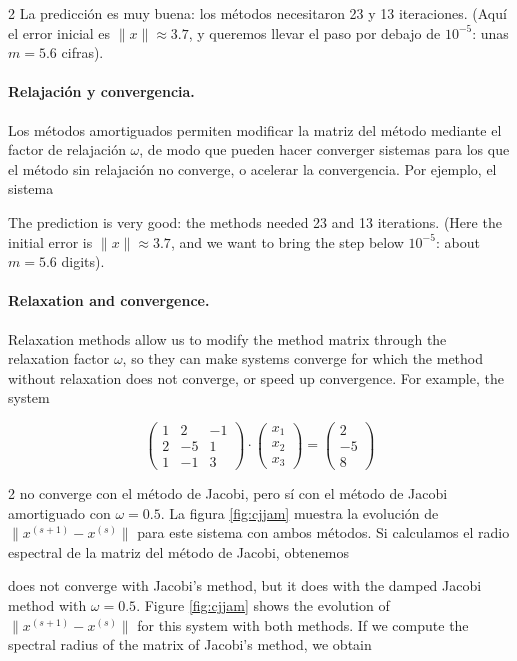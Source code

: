 \begin{paracol}{2}
La predicción es muy buena: los métodos necesitaron 23 y 13 iteraciones. (Aquí el error inicial es $\lVert x\rVert\approx 3.7$, y queremos llevar el paso por debajo de $10^{-5}$: unas $m=5.6$ cifras).

\paragraph{Relajación y convergencia.} Los métodos amortiguados permiten modificar la matriz del método mediante el factor de relajación $\omega$, de modo que pueden hacer converger sistemas para los que el método sin relajación no converge, o acelerar la convergencia. Por ejemplo, el sistema

\switchcolumn
The prediction is very good: the methods needed 23 and 13 iterations. (Here the initial error is $\lVert x\rVert\approx 3.7$, and we want to bring the step below $10^{-5}$: about $m=5.6$ digits).

\paragraph{Relaxation and convergence.} Relaxation methods allow us to modify the method matrix through the relaxation factor $\omega$, so they can make systems converge for which the method without relaxation does not converge, or speed up convergence. For example, the system
\end{paracol}

\begin{equation*}
\begin{pmatrix}
1& 2& -1\\
2& -5& 1\\
1& -1& 3
\end{pmatrix}\cdot \begin{pmatrix}
x_1\\
x_2\\
x_3
\end{pmatrix}=\begin{pmatrix}
2\\
-5\\
8
\end{pmatrix}
\end{equation*}

\begin{paracol}{2}
no converge con el método de Jacobi, pero sí con el método de Jacobi amortiguado con $\omega=0.5$. La figura \ref{fig:cjjam} muestra la evolución de $\lVert x^{(s+1)}-x^{(s)}\rVert$ para este sistema con ambos métodos. Si calculamos el radio espectral de la matriz del método de Jacobi, obtenemos

\switchcolumn
does not converge with Jacobi's method, but it does with the damped Jacobi method with $\omega=0.5$. Figure \ref{fig:cjjam} shows the evolution of $\lVert x^{(s+1)}-x^{(s)}\rVert$ for this system with both methods. If we compute the spectral radius of the matrix of Jacobi's method, we obtain
\end{paracol}

